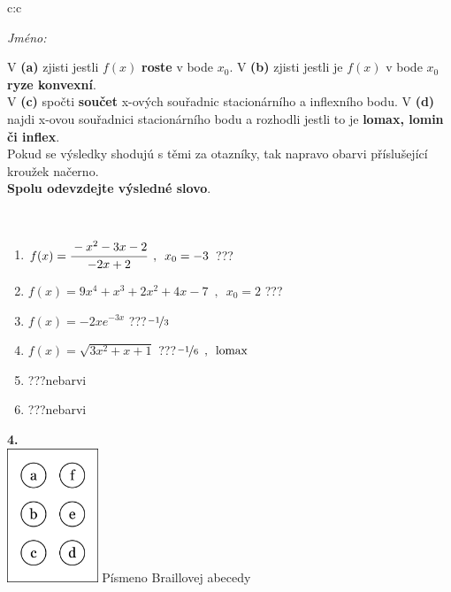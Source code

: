 \documentclass[10pt]{report}
\begin{document}
\begin{tabular}{c:c}
\begin{minipage}[c][104.5mm][t]{0.5\linewidth}
\begin{center}
\textit{Jméno:}\phantom{xxxxxxxxxxxxxxxxxxxxxxxxxxxxxxxxxxxxxxxxxxxxxxxxxxxxxxxxxxxxxxxxx}\\[5mm]
\begin{minipage}{0.95\linewidth}
\begin{center}
{\small V \textbf{(a)} zjisti jestli $f(x)$ \textbf{roste} v bode $x_0$. V \textbf{(b)} zjisti jestli je $f(x)$ v bode $x_0$ \textbf{ryze konvexní}.\\V \textbf{(c)} spočti \textbf{součet} x-ových souřadnic stacionárního a inflexního bodu. V \textbf{(d)} najdi x-ovou souřadnici stacionárního bodu a rozhodli jestli to je \textbf{lomax, lomin či inflex}.\\Pokud se výsledky shodujú s těmi za otazníky, tak napravo obarvi příslušející kroužek načerno.\\\textbf{Spolu odevzdejte výsledné slovo}}.
\end{center}
\end{minipage}
\\[1mm]
\begin{minipage}{0.79\linewidth}
\begin{center}
\begin{varwidth}{\linewidth}
\begin{enumerate}
\normalsize
\item $f(x)=\cfrac{-x^2-3x-2}{-2x+2}\enspace , \enspace x_0=-3$\quad \dotfill\; ???\;\dotfill \quad {}
\item $f(x)=9x^4+x^3+2x^2+4x-7\enspace , \enspace x_0=2$\quad \dotfill\; ???\;\dotfill \quad {}
\item $f(x)=-2xe^{-3x}$\quad \dotfill\; ???\;\dotfill \quad $\nicefrac{-1}{3}$
\item $f(x)=\sqrt{3x^2+x+1}$\quad \dotfill\; ???\;\dotfill \quad $\nicefrac{-1}{6}\enspace , \enspace\mathrm{lomax}$
\item \quad \dotfill\; ???\;\dotfill \quad nebarvi
\item \quad \dotfill\; ???\;\dotfill \quad nebarvi
\end{enumerate}
\end{varwidth}
\end{center}
\end{minipage}
\begin{minipage}{0.20\linewidth}
\begin{center}
{\Huge\bfseries 4.} \\[2mm]
\includegraphics[height=40mm]{../images/braille.png}
{\small Písmeno Braillovej abecedy}
\end{center}
\end{minipage}
\end{center}
\end{minipage}
%
\end{tabular}
\end{document}
